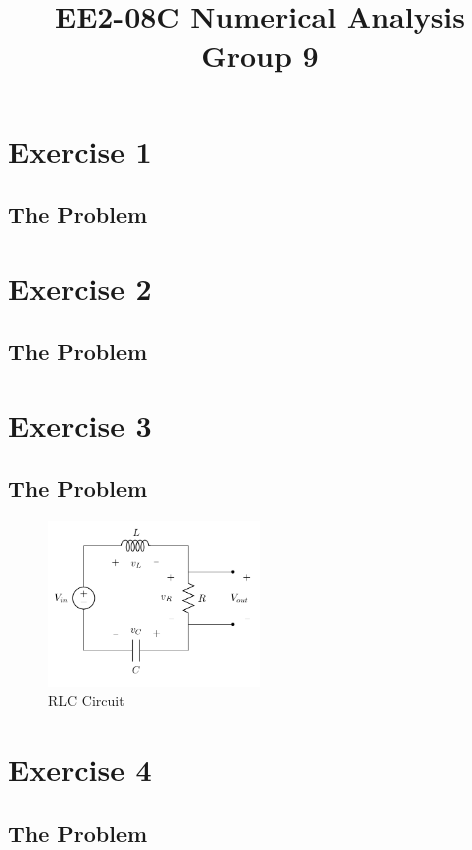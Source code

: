 \documentclass[11pt,a4paper]{article}
\date{}
\author{}
\begin{document}
\title{\textbf{EE2-08C Numerical Analysis} \\ Group 9\vspace{-17mm}}
\maketitle

\section*{Exercise 1}\vspace{-1mm}
\subsection*{The Problem}

\section*{Exercise 2}\vspace{-1mm}
\subsection*{The Problem}

\section*{Exercise 3}\vspace{-1mm}
\subsection*{The Problem}

\begin{figure}
  \includegraphics[width=0.5\textwidth]{Ex3_Figs/RLC.png}
  \caption{RLC Circuit}
  \label{fig:boat1}
\end{figure}


\section*{Exercise 4}\vspace{-1mm}
\subsection*{The Problem}
\end{document}
